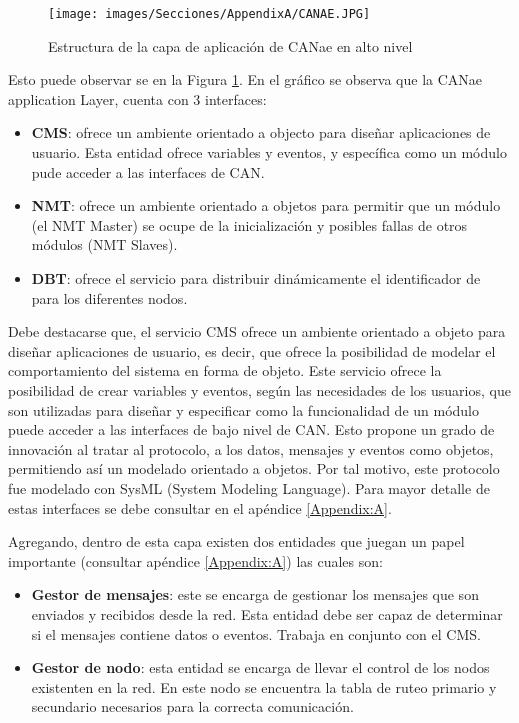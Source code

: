\begin{figure}[h!]
 \centering
 \texttt{[image: images/Secciones/AppendixA/CANAE.JPG]}
  \caption{Estructura de la capa de aplicación de CANae en alto nivel}
\label{fig:CANAEC4}
\end{figure}

Esto puede observar se en la Figura \ref{fig:CANAEC4}. En el gráfico
se observa que la CANae application Layer, cuenta con 3 interfaces:
\begin{itemize}
\item \textbf{CMS}: ofrece un ambiente orientado a objecto para diseñar aplicaciones de usuario.
  Esta entidad ofrece variables y eventos, y específica como un módulo pude acceder a
las interfaces de CAN.
\item \textbf{NMT}: ofrece un ambiente orientado a objetos para permitir que un módulo (el
NMT Master) se ocupe de la inicialización y posibles fallas de otros módulos (NMT Slaves).
\item \textbf{DBT}: ofrece el servicio para distribuir dinámicamente el identificador de para los diferentes nodos.
\end{itemize}
Debe destacarse que, el servicio CMS ofrece un ambiente orientado a objeto  para diseñar
aplicaciones de usuario, es decir, que ofrece la posibilidad de modelar el
comportamiento del sistema en forma de objeto. Este servicio ofrece la posibilidad
de crear variables y eventos, según las necesidades de los usuarios, que son
utilizadas para diseñar y especificar como la funcionalidad de un módulo puede
acceder a las interfaces de bajo nivel de CAN. Esto propone un grado de innovación
al tratar al protocolo, a los datos, mensajes y eventos como objetos, permitiendo así
un modelado orientado a objetos. Por tal motivo, este protocolo fue modelado
con SysML (System Modeling Language).
Para mayor detalle de estas interfaces se debe consultar en el apéndice \ref{Appendix:A}.

Agregando, dentro de esta capa existen dos entidades que juegan un papel importante
(consultar apéndice \ref{Appendix:A}) las cuales son:
\begin{itemize}
\item \textbf{Gestor de mensajes}: este se encarga de gestionar los mensajes que son enviados y recibidos desde la red.
Esta entidad debe ser capaz de determinar si el mensajes contiene datos o eventos. Trabaja en conjunto
con el CMS.
\item \textbf{Gestor de nodo}: esta entidad se encarga de llevar el control de los nodos existenten en la red. En este
nodo se encuentra la tabla de ruteo primario y secundario necesarios para la correcta comunicación.
\end{itemize}

